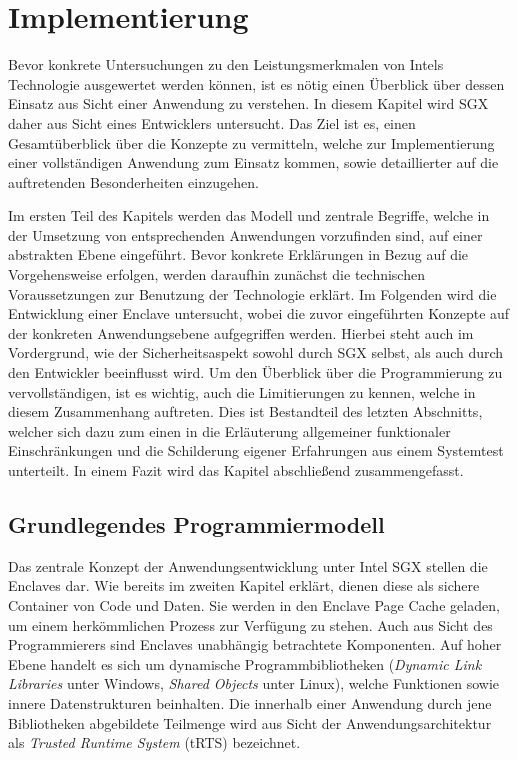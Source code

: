 \chapter{Implementierung}

Bevor konkrete Untersuchungen zu den Leistungsmerkmalen von Intels Technologie ausgewertet werden können, ist es nötig einen Überblick über dessen Einsatz aus Sicht einer Anwendung zu verstehen. In diesem Kapitel wird SGX daher aus Sicht eines Entwicklers untersucht. Das Ziel ist es, einen Gesamtüberblick über die Konzepte zu vermitteln, welche zur Implementierung einer vollständigen Anwendung zum Einsatz kommen, sowie detaillierter auf die auftretenden Besonderheiten einzugehen.

Im ersten Teil des Kapitels werden das Modell und zentrale Begriffe, welche in der Umsetzung von entsprechenden Anwendungen vorzufinden sind, auf einer abstrakten Ebene eingeführt. Bevor konkrete Erklärungen in Bezug auf die Vorgehensweise erfolgen, werden daraufhin zunächst die technischen Voraussetzungen zur Benutzung der Technologie erklärt. Im Folgenden wird die Entwicklung einer Enclave untersucht, wobei die zuvor eingeführten Konzepte auf der konkreten Anwendungsebene aufgegriffen werden. Hierbei steht auch im Vordergrund, wie der Sicherheitsaspekt sowohl durch SGX selbst, als auch durch den Entwickler beeinflusst wird. Um den Überblick über die Programmierung zu vervollständigen, ist es wichtig, auch die Limitierungen zu kennen, welche in diesem Zusammenhang auftreten. Dies ist Bestandteil des letzten Abschnitts, welcher sich dazu zum einen in die Erläuterung allgemeiner funktionaler Einschränkungen und die Schilderung eigener Erfahrungen aus einem Systemtest unterteilt. In einem Fazit wird das Kapitel abschließend zusammengefasst.

\section{Grundlegendes Programmiermodell}

Das zentrale Konzept der Anwendungsentwicklung unter Intel SGX stellen die Enclaves dar. Wie bereits im zweiten Kapitel erklärt, dienen diese als sichere Container von Code und Daten. Sie werden in den Enclave Page Cache geladen, um einem herkömmlichen Prozess zur Verfügung zu stehen. Auch aus Sicht des Programmierers sind Enclaves unabhängig betrachtete Komponenten. Auf hoher Ebene handelt es sich um dynamische Programmbibliotheken (\textit{Dynamic Link Libraries} unter Windows,  \textit{Shared Objects} unter Linux), welche Funktionen sowie innere Datenstrukturen beinhalten. Die innerhalb einer Anwendung durch jene Bibliotheken abgebildete Teilmenge wird aus Sicht der Anwendungsarchitektur als \textit{Trusted Runtime System} (tRTS) bezeichnet.

